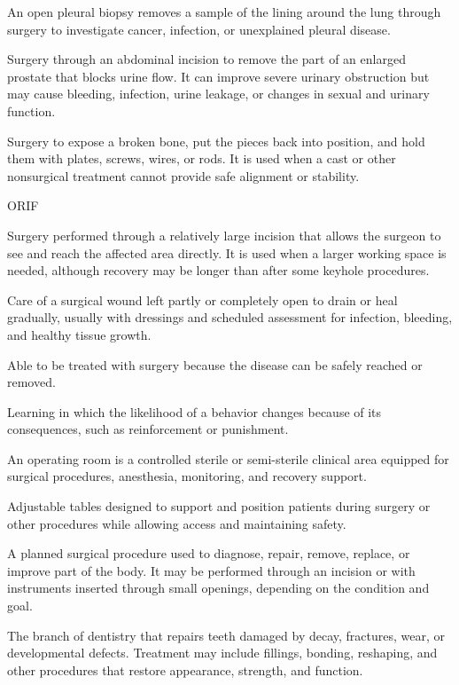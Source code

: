  An open pleural biopsy removes a sample of the lining around the lung through surgery to investigate cancer, infection, or unexplained pleural disease.

 Surgery through an abdominal incision to remove the part of an enlarged prostate that blocks urine flow. It can improve severe urinary obstruction but may cause bleeding, infection, urine leakage, or changes in sexual and urinary function.

 Surgery to expose a broken bone, put the pieces back into position, and hold them with plates, screws, wires, or rods. It is used when a cast or other nonsurgical treatment cannot provide safe alignment or stability.

\synonyms
ORIF

 Surgery performed through a relatively large incision that allows the surgeon to see and reach the affected area directly. It is used when a larger working space is needed, although recovery may be longer than after some keyhole procedures.

 Care of a surgical wound left partly or completely open to drain or heal gradually, usually with dressings and scheduled assessment for infection, bleeding, and healthy tissue growth.

 Able to be treated with surgery because the disease can be safely reached or removed.

 Learning in which the likelihood of a behavior changes because of its consequences, such as reinforcement or punishment.

 An operating room is a controlled sterile or semi-sterile clinical area equipped for surgical procedures, anesthesia, monitoring, and recovery support.

 Adjustable tables designed to support and position patients during surgery or other procedures while allowing access and maintaining safety.

 A planned surgical procedure used to diagnose, repair, remove, replace, or improve part of the body. It may be performed through an incision or with instruments inserted through small openings, depending on the condition and goal.

 The branch of dentistry that repairs teeth damaged by decay, fractures, wear, or developmental defects. Treatment may include fillings, bonding, reshaping, and other procedures that restore appearance, strength, and function.

